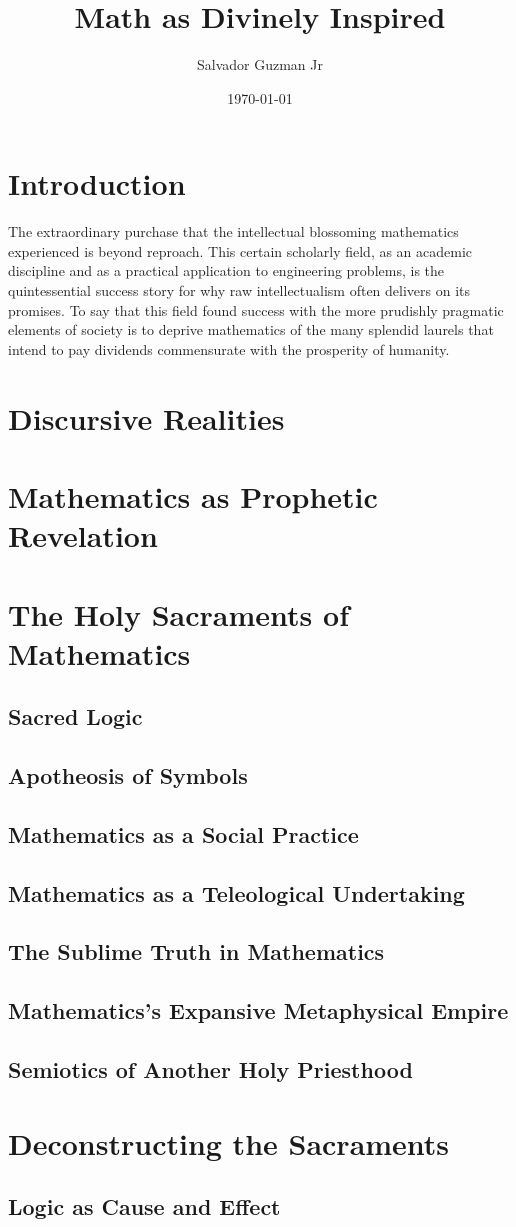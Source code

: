 \documentclass{article}
\begin{document}
	
	\title{Math as Divinely Inspired}
	\author{Salvador Guzman Jr}
	\date{\today}
	\maketitle
	\tableofcontents
	
	\section{Introduction}
	The extraordinary purchase that the intellectual blossoming mathematics experienced is beyond reproach. This certain scholarly field, as an academic discipline and as a practical application to engineering problems, is the quintessential success story for why raw intellectualism often delivers on its promises. To say that this field found success with the more prudishly pragmatic elements of society is to deprive mathematics of the many splendid laurels that intend to pay dividends commensurate with the prosperity of humanity.
	
	\section{Discursive Realities}
	\section{Mathematics as Prophetic Revelation}
	
	\section{The Holy Sacraments of Mathematics}
	\subsection{Sacred Logic}
	\subsection{Apotheosis of Symbols}
	\subsection{Mathematics as a Social Practice}
	\subsection{Mathematics as a Teleological Undertaking}
	\subsection{The Sublime Truth in Mathematics}
	\subsection{Mathematics's Expansive Metaphysical Empire}
	\subsection{Semiotics of Another Holy Priesthood}
	\section{Deconstructing the Sacraments}
	\subsection{Logic as Cause and Effect}
	
	
\end{document}
